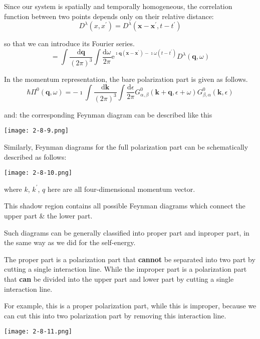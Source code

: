 Since our system is spatially and temporally homogeneous, the correlation function between two points depends only on their relative distance:
\[D^{\lambda}(x,x^{'}) = D^{\lambda}(\mathbf{x}-\mathbf{x}^{'},t-t^{'})\]

so that we can introduce its Fourier series.
\[=\int \frac{\mathrm{d}\mathbf{q}}{(2\pi)^3}\int \frac{\mathrm{d} \omega}{2\pi} \mathrm{e}^{\imath \mathbf{q}(\mathbf{x}-\mathbf{x}^{'})-\imath \omega(t-t^{'})}D^{\lambda}(\mathbf{q},\omega)\]

In the momentum representation, the bare polarization part is given as follows.
\[ \hbar \Pi^0(\mathbf{q},\omega) = -\imath \int \frac{\mathrm{d}\mathbf{k}}{(2\pi)^3} \int \frac{\mathrm{d}\epsilon}{2\pi} G^0_{\alpha,\beta}(\mathbf{k}+\mathbf{q},\epsilon+\omega)G^0_{\beta,\alpha}(\mathbf{k},\epsilon) \]

and: the corresponding Feynman diagram can be described like this
\begin{center} \label{Fig2.8.9}
\texttt{[image: 2-8-9.png]}
\end{center}

Similarly, Feynman diagrams for the full polarization part can be schematically described as follows:
\begin{center} \label{Fig2.8.10}
\texttt{[image: 2-8-10.png]}
\end{center}

where $k$, $k^{'}$, $q$ here are all four-dimensional momentum vector.

This shadow region contains all possible Feynman diagrams which connect the upper part \& the lower part.

Such diagrams can be generally classified into proper part and inproper part, in the same way as we did for the self-energy.

The proper part is a polarization part that \textbf{cannot} be separated into two part by cutting a single interaction line. While the improper part is a polarization part that \textbf{can} be divided into the upper part and lower part by cutting a single interaction line.

For example, this is a proper polarization part, while this is improper, because we can cut this into two polarization part by removing this interaction line.
\begin{center} \label{Fig2.8.11}
\texttt{[image: 2-8-11.png]}
\end{center}

